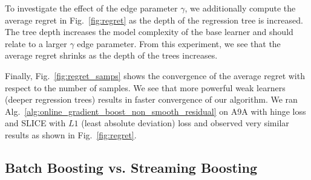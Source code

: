 To investigate the effect of the edge parameter $\gamma$, we additionally compute the average regret in Fig.~\ref{fig:regret} as the depth of the regression tree is increased. The tree depth increases the model complexity of the base learner and should relate to a larger $\gamma$ edge parameter. From this experiment, we see that the average regret shrinks as the depth of the trees increases.

Finally, Fig.~\ref{fig:regret_samps} shows the convergence of the average regret with respect to the number of samples. We see that more powerful weak learners (deeper regression trees) results in faster convergence of our algorithm. We ran Alg.~\ref{alg:online_gradient_boost_non_smooth_residual} on A9A with hinge loss and SLICE with $L1$ (least absolute deviation) loss and observed very similar results as shown in Fig.~\ref{fig:regret}. %

\subsection{Batch Boosting vs. Streaming Boosting}



